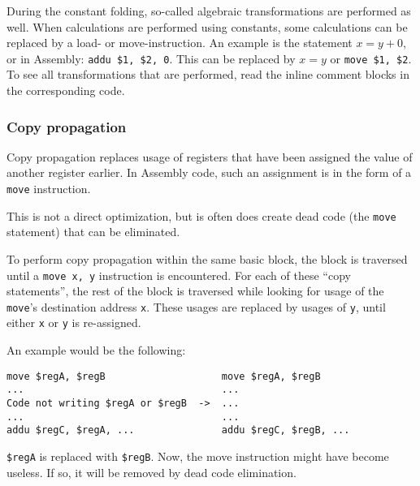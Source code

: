 \documentclass[10pt,a4paper]{article}
\begin{document}

During the constant folding, so-called algebraic transformations are performed
as well. When calculations are performed using constants, some calculations can
be replaced by a load- or move-instruction. An example is the statement
$x = y + 0$, or in Assembly: \texttt{addu \$1, \$2, 0}. This can be replaced by
$x = y$ or \texttt{move \$1, \$2}. To see all transformations that are
performed, read the inline comment blocks in the corresponding code.

\subsubsection{Copy propagation}

Copy propagation replaces usage of registers that have been assigned the value
of another register earlier. In Assembly code, such an assignment is in the
form of a \texttt{move} instruction.

This is not a direct optimization, but is often does create dead code (the
\texttt{move} statement) that can be eliminated.

To perform copy propagation within the same basic block, the block is traversed
until a \texttt{move x, y} instruction is encountered. For each of these ``copy
statements'', the rest of the block is traversed while looking for usage of the
\texttt{move}'s destination address \texttt{x}. These usages are replaced by
usages of \texttt{y}, until either \texttt{x} or \texttt{y} is re-assigned.

An example would be the following:
\begin{verbatim}
move $regA, $regB                    move $regA, $regB
...                                  ...
Code not writing $regA or $regB  ->  ...
...                                  ...
addu $regC, $regA, ...               addu $regC, $regB, ...
\end{verbatim}
\texttt{\$regA} is replaced with \texttt{\$regB}. Now, the move instruction
might have become useless. If so, it will be removed by dead code elimination.
\end{document}
